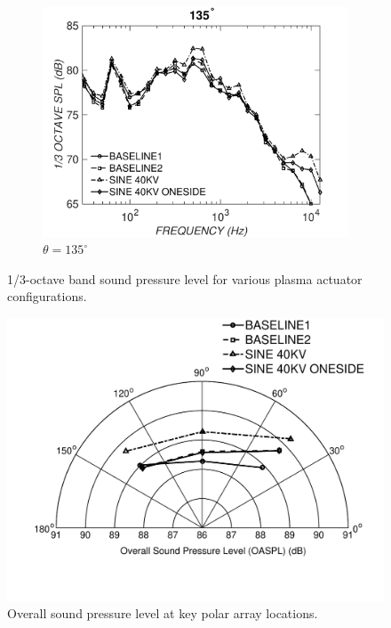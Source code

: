 \begin{figure}
\begin{center}
\hspace*{\fill} %

\begin{subfigure}{0.5\textwidth}
\includegraphics[width=\linewidth]{figures/octave135}
\caption{$\theta=135^\circ$}
\label{fig:octave135}
\end{subfigure}

\caption{1/3-octave band sound pressure level for various plasma actuator configurations.}
\label{fig:octave}
\end{center}
\end{figure}

\begin{figure}
	\begin{center}
		\centerline{\includegraphics[scale=0.7]{figures/polar_plot4}}
		\caption{Overall sound pressure level at key polar array locations.}
		\label{fig:polar}
	\end{center}
\end{figure}

